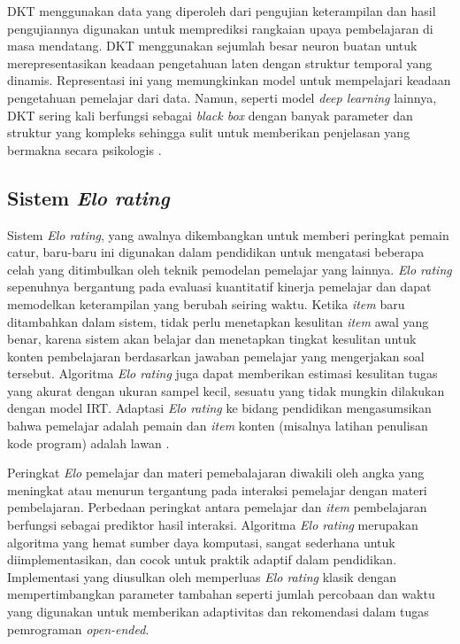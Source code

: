 DKT menggunakan data yang diperoleh dari 
pengujian keterampilan dan hasil pengujiannya digunakan untuk memprediksi rangkaian upaya pembelajaran di masa mendatang. DKT menggunakan sejumlah besar neuron buatan 
untuk merepresentasikan keadaan pengetahuan laten dengan struktur temporal yang dinamis. Representasi ini yang memungkinkan model untuk mempelajari keadaan pengetahuan pemelajar dari data. Namun,
seperti model \textit{deep learning} lainnya, DKT sering kali berfungsi sebagai \textit{black box} dengan banyak parameter dan struktur yang kompleks sehingga sulit untuk memberikan penjelasan yang bermakna secara psikologis \autocite{Minn2022}.

\subsection{Sistem \textit{Elo rating}}
Sistem \textit{Elo rating}, yang awalnya dikembangkan untuk memberi peringkat
pemain catur, baru-baru ini digunakan dalam pendidikan untuk mengatasi beberapa
celah yang ditimbulkan oleh teknik pemodelan pemelajar yang lainnya. \textit{Elo rating} sepenuhnya bergantung
pada evaluasi kuantitatif kinerja pemelajar dan dapat memodelkan keterampilan yang
berubah seiring waktu. Ketika \textit{item} baru ditambahkan dalam sistem, tidak
perlu menetapkan kesulitan \textit{item} awal yang benar, karena sistem akan belajar
dan menetapkan tingkat kesulitan untuk konten pembelajaran berdasarkan jawaban pemelajar yang mengerjakan soal tersebut. Algoritma \textit{Elo rating} juga dapat memberikan estimasi
kesulitan tugas yang akurat dengan ukuran sampel kecil, sesuatu yang tidak mungkin
dilakukan dengan model IRT. Adaptasi \textit{Elo rating} ke
bidang pendidikan mengasumsikan bahwa pemelajar adalah pemain dan \textit{item} konten
(misalnya latihan penulisan kode program) adalah lawan \autocite{Vesin2022}.

Peringkat \textit{Elo} pemelajar
dan materi pemebalajaran diwakili oleh angka yang meningkat atau menurun tergantung pada interaksi pemelajar dengan materi pembelajaran. Perbedaan peringkat antara pemelajar dan \textit{item} pembelajaran berfungsi sebagai prediktor hasil interaksi. Algoritma \textit{Elo rating} merupakan algoritma yang hemat sumber daya komputasi, sangat sederhana untuk diimplementasikan, dan cocok untuk praktik adaptif dalam pendidikan. Implementasi
yang diusulkan oleh \textcite{Vesin2022} memperluas \textit{Elo rating} klasik dengan
mempertimbangkan parameter tambahan seperti jumlah percobaan dan waktu yang digunakan untuk memberikan adaptivitas dan
rekomendasi dalam tugas pemrograman \textit{open-ended}.

